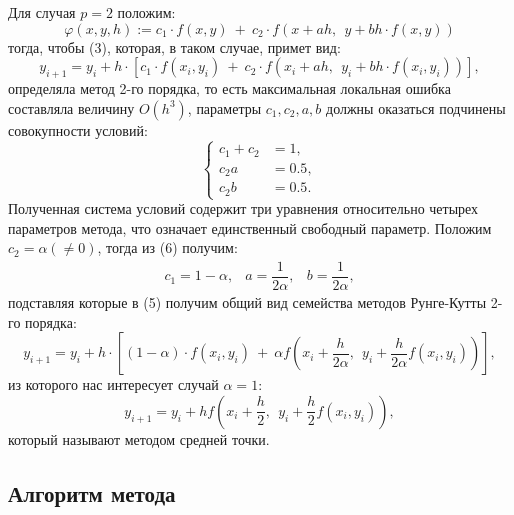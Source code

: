 Для случая $p=2$ положим:
\begin{equation}
    \varphi(x,y,h) := c_1\cdot f(x,y) ~+~ c_2\cdot f(x+ah,~~ y+bh\cdot f(x,y))
\end{equation}
тогда, чтобы (3), которая, в таком случае, примет вид:
\begin{equation}
    y_{i+1} = y_i + h \cdot \left[ c_1\cdot f(x_i,y_i) ~+~ c_2\cdot f(x_i+ah,~~ y_i+bh\cdot f(x_i,y_i)) \right],
\end{equation}
определяла метод 2-го порядка, то есть максимальная локальная ошибка составляла величину $O(h^3)$, параметры $c_1, c_2, a, b$ должны оказаться подчинены совокупности условий:
\begin{equation}
\begin{cases}
    c_1 + c_2 &= 1,\\
    c_2a &= 0.5,\\
    c_2b &= 0.5.
\end{cases}
\end{equation}
Полученная система условий содержит три уравнения относительно четырех параметров метода, что означает единственный свободный параметр. Положим $c_2 = \alpha (\ne 0)$, тогда из (6) получим:
\begin{equation}
    \begin{matrix}
        c_1=1-\alpha, & a=\dfrac{1}{2\alpha}, & b=\dfrac{1}{2\alpha},
    \end{matrix}
\end{equation}
подставляя которые в (5) получим общий вид семейства методов Рунге-Кутты 2-го порядка:
\begin{equation}
     y_{i+1} = y_i + h \cdot \left[ (1-\alpha)\cdot f(x_i,y_i) ~+~ \alpha f\left(x_i+\dfrac{h}{2\alpha},~~ y_i+\dfrac{h}{2\alpha}f(x_i,y_i)\right) \right],
\end{equation}
из которого нас интересует случай $\alpha=1$:
\begin{equation}
    y_{i+1} = y_i + hf\left(x_i+\dfrac{h}{2},~~ y_i+\dfrac{h}{2}f(x_i,y_i)\right),
\end{equation}
который называют методом средней точки.

\subsection{Алгоритм метода}

